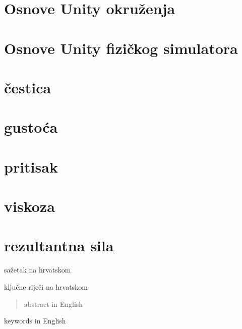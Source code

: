 \documentclass[diplomskirad]{fer}
\begin{document}
    \section{Osnove Unity okruženja}\label{sec:osnove-unity-okruzenja}
    \section{Osnove Unity fizičkog simulatora}\label{sec:osnove-unity-fizickog-simulatora}
    \section{čestica}\label{sec:cestica}
    \section{gustoća}\label{sec:gustoca}
    \section{pritisak}\label{sec:pritisak}
    \section{viskoza}\label{sec:viskoza}
    \section{rezultantna sila}\label{sec:rezultantna-sila}


    
    \begin{sazetak}
        sažetak na hrvatskom
    \end{sazetak}
    \begin{kljucnerijeci}
        ključne riječi na hrvatskom
    \end{kljucnerijeci}
    \begin{abstract}
        abstract in English
    \end{abstract}
    \begin{keywords}
        keywords in English
    \end{keywords}
\end{document}
